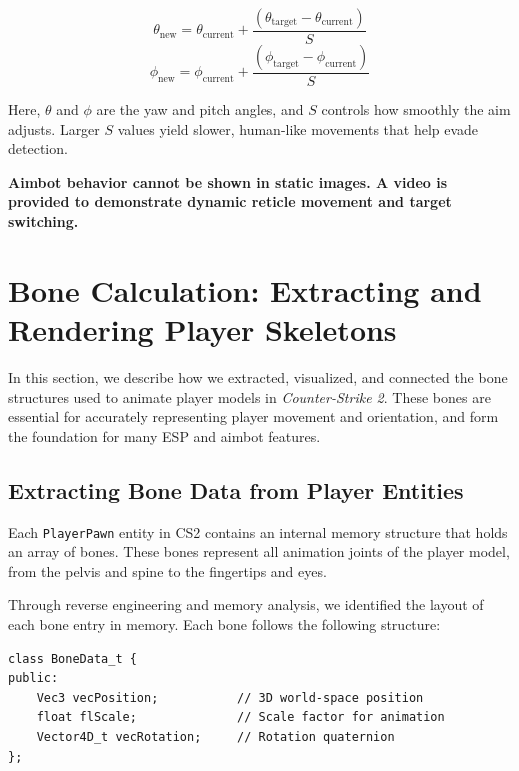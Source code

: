\[
\theta_{\text{new}} = \theta_{\text{current}} + \frac{(\theta_{\text{target}} - \theta_{\text{current}})}{S}
\]
\[
\phi_{\text{new}} = \phi_{\text{current}} + \frac{(\phi_{\text{target}} - \phi_{\text{current}})}{S}
\]

Here, \( \theta \) and \( \phi \) are the yaw and pitch angles, and \( S \) controls how smoothly the aim adjusts. Larger \( S \) values yield slower, human-like movements that help evade detection.

\begin{tcolorbox}[colback=gray!5!white, colframe=black!75!white, title=\textbf{Aimbot Demonstration Note}]
\textbf{Aimbot behavior cannot be shown in static images. A video is provided to demonstrate dynamic reticle movement and target switching.}
\end{tcolorbox}

\section{Bone Calculation: Extracting and Rendering Player Skeletons}

In this section, we describe how we extracted, visualized, and connected the bone structures used to animate player models in \textit{Counter-Strike 2}. These bones are essential for accurately representing player movement and orientation, and form the foundation for many ESP and aimbot features.

\subsection{Extracting Bone Data from Player Entities}

Each \texttt{PlayerPawn} entity in CS2 contains an internal memory structure that holds an array of bones. These bones represent all animation joints of the player model, from the pelvis and spine to the fingertips and eyes.

Through reverse engineering and memory analysis, we identified the layout of each bone entry in memory. Each bone follows the following structure:

\begin{lstlisting}[style=cppstyle, caption={Bone Memory Structure}]
class BoneData_t {
public:
    Vec3 vecPosition;           // 3D world-space position
    float flScale;              // Scale factor for animation
    Vector4D_t vecRotation;     // Rotation quaternion
};
\end{lstlisting}

